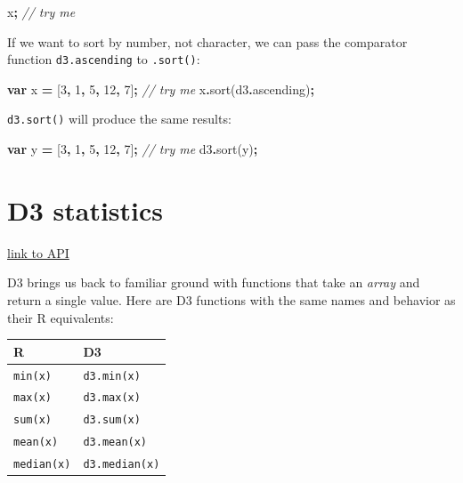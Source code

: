 \documentclass[
  openany]{book}
\newenvironment{Shaded}{\begin{snugshade}}{\end{snugshade}}
\newcommand{\AttributeTok}[1]{\textcolor[rgb]{0.77,0.63,0.00}{#1}}
\newcommand{\CommentTok}[1]{\textcolor[rgb]{0.56,0.35,0.01}{\textit{#1}}}
\newcommand{\DecValTok}[1]{\textcolor[rgb]{0.00,0.00,0.81}{#1}}
\newcommand{\FunctionTok}[1]{\textcolor[rgb]{0.00,0.00,0.00}{#1}}
\newcommand{\KeywordTok}[1]{\textcolor[rgb]{0.13,0.29,0.53}{\textbf{#1}}}
\newcommand{\NormalTok}[1]{#1}
\newcommand{\OperatorTok}[1]{\textcolor[rgb]{0.81,0.36,0.00}{\textbf{#1}}}
\begin{document}
\begin{Shaded}
\begin{Highlighting}[]
\NormalTok{x}\OperatorTok{;}     \CommentTok{// try me}
\end{Highlighting}
\end{Shaded}

If we want to sort by number, not character, we can pass the comparator function \texttt{d3.ascending} to \texttt{.sort()}:

\begin{Shaded}
\begin{Highlighting}[]
\KeywordTok{var}\NormalTok{ x }\OperatorTok{=}\NormalTok{ [}\DecValTok{3}\OperatorTok{,} \DecValTok{1}\OperatorTok{,} \DecValTok{5}\OperatorTok{,} \DecValTok{12}\OperatorTok{,} \DecValTok{7}\NormalTok{]}\OperatorTok{;}     \CommentTok{// try me}
\NormalTok{x}\OperatorTok{.}\FunctionTok{sort}\NormalTok{(d3}\OperatorTok{.}\AttributeTok{ascending}\NormalTok{)}\OperatorTok{;}
\end{Highlighting}
\end{Shaded}

\texttt{d3.sort()} will produce the same results:

\begin{Shaded}
\begin{Highlighting}[]
\KeywordTok{var}\NormalTok{ y }\OperatorTok{=}\NormalTok{ [}\DecValTok{3}\OperatorTok{,} \DecValTok{1}\OperatorTok{,} \DecValTok{5}\OperatorTok{,} \DecValTok{12}\OperatorTok{,} \DecValTok{7}\NormalTok{]}\OperatorTok{;}     \CommentTok{// try me}
\NormalTok{d3}\OperatorTok{.}\FunctionTok{sort}\NormalTok{(y)}\OperatorTok{;}
\end{Highlighting}
\end{Shaded}

\hypertarget{d3-statistics}{%
\section{D3 statistics}\label{d3-statistics}}

\href{https://github.com/d3/d3-array/blob/v1.2.4/README.md\#statistics}{link to API}

D3 brings us back to familiar ground with functions that take an \emph{array} and return a single value. Here are D3 functions with the same names and behavior as their R equivalents:

\begin{longtable}[]{@{}ll@{}}
\toprule
R & D3\tabularnewline
\midrule
\endhead
\texttt{min(x)} & \texttt{d3.min(x)}\tabularnewline
\texttt{max(x)} & \texttt{d3.max(x)}\tabularnewline
\texttt{sum(x)} & \texttt{d3.sum(x)}\tabularnewline
\texttt{mean(x)} & \texttt{d3.mean(x)}\tabularnewline
\texttt{median(x)} & \texttt{d3.median(x)}\tabularnewline
\bottomrule
\end{longtable}
\end{document}
